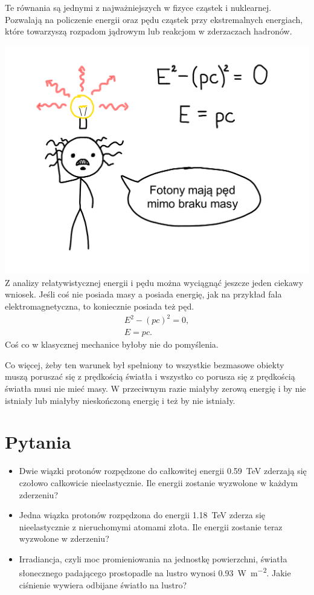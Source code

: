 \documentclass[10pt,twocolumn,fleqn,polish]{article}
\begin{document}
Te równania są jednymi z najważniejszych w fizyce cząstek i nuklearnej.
Pozwalają na policzenie energii oraz pędu cząstek przy ekstremalnych energiach,
które towarzyszą rozpadom jądrowym lub reakcjom w zderzaczach hadronów.
\newpage

\noindent\includegraphics[width=1\linewidth]{pages/STA-page39}
Z analizy relatywistycznej energii i pędu można wyciągnąć jeszcze jeden ciekawy
wniosek. Jeśli coś nie posiada masy a posiada energię, jak na przykład fala
elektromagnetyczna, to koniecznie posiada też pęd.
\begin{gather*}
  E^2 - (pc)^2 = 0, \\
  E = pc.
\end{gather*}
Coś co w klasycznej mechanice byłoby nie do pomyślenia.

Co więcej, żeby ten warunek był spełniony to wszystkie bezmasowe obiekty muszą
poruszać się z prędkością światła i wszystko co porusza się z prędkością światła
musi nie mieć masy. W przeciwnym razie miałyby zerową energię i by nie istniały
lub miałyby nieskończoną energię i też by nie istniały.
\newpage

\section*{Pytania}
\begin{itemize}
\item Dwie wiązki protonów rozpędzone do całkowitej energii \SI{0.59}{TeV}
      zderzają się czołowo całkowicie nieelastycznie. Ile energii zostanie
      wyzwolone w każdym zderzeniu?
\item Jedna wiązka protonów rozpędzona do energii \SI{1.18}{TeV} zderza się
      nieelastycznie z nieruchomymi atomami złota. Ile energii zostanie teraz
      wyzwolone w zderzeniu?
\item Irradiancja, czyli moc promieniowania na jednostkę powierzchni, światła
      słonecznego padającego prostopadle na lustro wynosi
      \SI{0.93}{\watt\per\meter\squared}. Jakie ciśnienie wywiera odbijane
      światło na lustro?
\end{itemize}
\newpage
\end{document}

